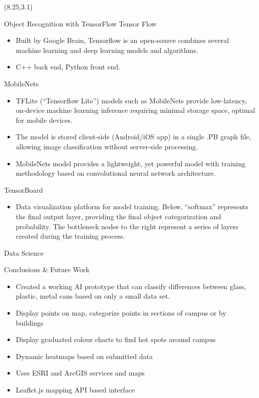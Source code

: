 \documentclass[22pt]{beamer}
\begin{document}
\begin{frame}[fragile]
\begin{textblock}{7.25}(8.25,3.1)
\begin{block}{Object Recognition with TensorFlow}
Tensor Flow
\begin{itemize}
\item Built by Google Brain, Tensorflow is an open-source combines several machine learning and deep learning models and algorithms.
\item C++ back end, Python front end.
\end{itemize}
MobileNets
\begin{itemize}
\item TFLite (“Tensorflow Lite”) models such as MobileNets provide low-latency, on-device machine learning inference requiring minimal storage space, optimal for mobile devices. 
\item The model is stored client-side (Android/iOS app) in a single .PB graph file, allowing image classification without server-side processing. 
\item MobileNets model provides a lightweight, yet powerful model with training methodology based on convolutional neural network architecture.
\end{itemize}
TensorBoard
\begin{itemize}
\item Data visualization platform for model training. Below, “softmax” represents the final output layer, providing the final object categorization and probability. The bottleneck nodes to the right represent a series of layers created during the training process. 
\end{itemize}
\end{block}

\begin{block}{Data Science}

\end{block}

\begin{block}{Conclusions \& Future Work}
\begin{itemize}
\item Created a working AI prototype that can classify differences between glass, plastic, metal cans based on only a small data set.
\item Display points on map, categorize points in sections of campus or by buildings
\item Display graduated colour charts to find hot spots around campus
\item Dynamic heatmaps based on submitted data 
\item Uses ESRI and ArcGIS services and maps 
\item Leaflet.js mapping API based interface
\end{itemize}
\end{block}


\end{textblock}
\end{frame}
\end{document}
